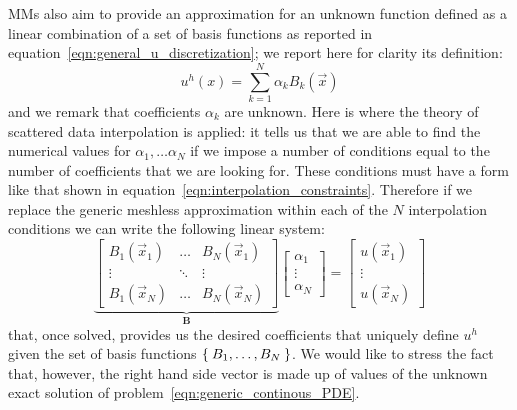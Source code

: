 MMs also aim to provide an approximation for an unknown function defined as a linear combination of a set of basis functions as reported in equation~\eqref{eqn:general_u_discretization}; we report here for clarity its definition:
\begin{equation}
	\label{eqn:general_u_discretization_RBF_section}
	u^{h}({x}) = \sum_{k= 1}^{N} {\alpha_k B_k(\vec{x})}
\end{equation}
and we remark that coefficients $\alpha_k$ are unknown.
Here is where the theory of scattered data interpolation is applied: it tells us that we are able to find the numerical values for $\alpha_1, \dots \alpha_N$ if we impose a number of conditions equal to the number of coefficients that we are looking for. These conditions must have a form like that shown in equation~\eqref{eqn:interpolation_constraints}. Therefore if we replace the generic meshless approximation within each of the $N$ interpolation conditions we can write the following linear system:
\begin{equation}
	\label{eqn:general_system_from_scattred_data_interpolation}
	\underbrace{
		\begin{bmatrix}
			B_1(\vec{x}_1)  & \dots		& B_N(\vec{x}_1)     \\
			\vdots					& \ddots  & \vdots					      \\
			B_1(\vec{x}_N)  & \dots		& B_N(\vec{x}_N)
	\end{bmatrix}}_{\boldsymbol{B}}
	\begin{bmatrix}
		\alpha_1 \\
		\vdots		\\
		\alpha_N
	\end{bmatrix}
	=
	\begin{bmatrix}
		u(\vec{x}_1)  \\
		\vdots				\\
		u(\vec{x}_N)
	\end{bmatrix}
\end{equation}
that, once solved, provides us the desired coefficients that uniquely define $ u^h $ given the set of basis functions $ \Set{B_1, \dots, B_N} $.
We would like to stress the fact that, however, the right hand side vector is made up of values of the unknown exact solution of problem~\eqref{eqn:generic_continous_PDE}.

